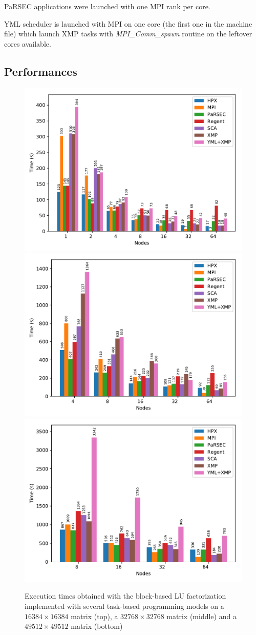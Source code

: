 PaRSEC applications were launched with one MPI rank per core.

YML scheduler is launched with MPI on one core (the first one in the machine file) which launch XMP tasks with \textit{MPI\_Comm\_spawn} routine on the leftover cores available.

\subsection{Performances}
\begin{figure}[h]
	\centering
	\includegraphics[width=.6\linewidth]{fig_strong_scaling_bar_task}
	\includegraphics[width=.6\linewidth]{fig_strong_scaling_bar_task_32k}
	\includegraphics[width=.6\linewidth]{fig_strong_scaling_bar_task_49k}
	\caption{Execution times obtained with the block-based LU factorization implemented with several task-based programming models on a $16384 \times 16384$ matrix (top), a $32768 \times 32768$ matrix (middle) and a $49512 \times 49512$ matrix (bottom)\label{fig:perf}}
\end{figure}


